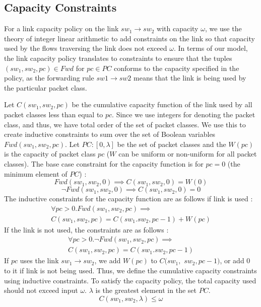 \documentclass[]{sig}
\begin{document}
\subsection{Capacity Constraints}
For a link capacity policy on the link $sw_1 \rightarrow sw_2$ with capacity $\omega$, we use the theory of integer linear arithmetic to add constraints on the link so that capacity used by the flows traversing the link does not exceed $\omega$. In terms of our model, the link capacity policy translates to constraints to ensure that the tuples $(sw_1, sw_2, pc) \in Fwd$ for $pc \in PC$ conforms to the capacity specified in the policy, as the forwarding rule $sw1 \rightarrow sw2$ means that the link is being used by the particular packet class.
 
Let $C(sw_1,sw_2,pc)$ be the cumulative capacity function of the link used by all packet classes less than equal to $pc$. Since we use integers for denoting the packet class, and thus, we have total order of the set of packet classes. We use this to create inductive constraints to sum over the set of Boolean variables $Fwd(sw_1, sw_2,pc)$. Let $PC : [0, \lambda]$ be the set of packet classes and the $W(pc)$ is the capacity of packet class $pc$ ($W$ can be uniform or non-uniform for all packet classes). 
The base case constraint for the capacity function is for $pc = 0$ (the minimum element of $PC$) :
\begin{equation}
	Fwd(sw_1, sw_2, 0) \implies C(sw_1, sw_2, 0) = W(0)
\end{equation}
\begin{equation}
	\neg Fwd(sw_1, sw_2, 0) \implies C(sw_1, sw_2, 0) = 0
\end{equation} 
The inductive constraints for the capacity function are as follows if link is used : 
\begin{multline}
	\forall pc > 0. Fwd(sw_1,sw_2,pc) \implies \\ C(sw_1, sw_2, pc) =  C(sw_1. sw_2, pc - 1) + W(pc)
\end{multline}
If the link is not used, the constraints are as follows : 
\begin{multline}
\forall pc > 0. \neg Fwd(sw_1,sw_2,pc) \implies \\ C(sw_1, sw_2, pc) =  C(sw_1. sw_2, pc - 1)
\end{multline}
If $pc$ uses the link $sw_1 \rightarrow sw_2$, we add $W(pc)$ to $C(sw_1,$ $sw_2,pc-1)$, or add 0 to it if link is not being used. Thus, we define the cumulative capacity constraints using inductive constraints. To satisfy the capacity policy, the total capacity used should not exceed input $\omega$. $\lambda$ is the greatest element in the set $PC$. 
\begin{equation}
	C(sw_1, sw_2, \lambda) \leq \omega	
\end{equation} 
\end{document}

